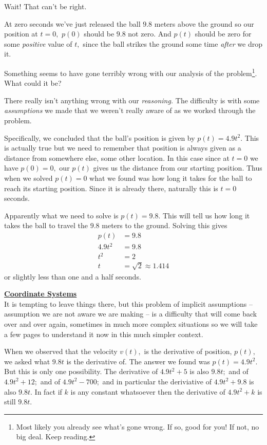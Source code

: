 {\sc Wait!} That can't be right.

At zero seconds we've just released the ball $9.8$ meters above the
ground so our position at $t=0,$ $p(0)$ should be $9.8$ not zero. And
$p(t)$ should be zero for some \emph{positive} value of $t,$  since
the ball strikes the ground some time \emph{after} we drop it.

Something seems to have gone terribly wrong with our analysis of the
problem\footnote{Most likely you already see what's gone wrong. If so,
good for you! If not, no big deal. Keep reading.}. What could it be?

There really isn't anything wrong with our \emph{reasoning.} The
difficulty is with some \emph{assumptions} we made that we weren't
really aware of as we worked through the problem.

Specifically, we concluded that the ball's position is given by
$p(t)=4.9t^2.$ This is actually true but we need to remember that
position is always given as a distance from somewhere else, some other
location. In this case since at $t=0$ we have $p(0)=0,$ our $p(t)$
gives us the distance from our starting position. Thus when we solved
$p(t)=0$ what we found was how long it takes for the ball to reach its
starting position. Since it is already there, naturally this is $t=0$
seconds.

Apparently what we need to solve is $p(t)=9.8.$ This will tell us how
long it takes the ball to travel the $9.8$ meters to the
ground. Solving this gives
\begin{align*}
  p(t) &= 9.8\\
  4.9t^2&=9.8\\
  t^2&=2\\
  t&=\sqrt{2}\approx 1.414
\end{align*}
or slightly less than one and a half seconds.

\noindent\underline{\bf Coordinate Systems}\\
It is tempting to leave things there, but this problem of implicit
assumptions -- assumption we are not aware we are making -- is a
difficulty that will come back over and over again, sometimes in much
more complex situations so we will take a few pages to understand it
now in this much simpler context.


When we observed that the velocity $v(t),$ is the derivative of
position, $p(t),$ we asked what $9.8t$ is the derivative of. The
answer we found was $p(t) =4.9t^2.$ But this is only one
possibility. The derivative of $4.9t^2+5$ is also $9.8t;$ and of
$4.9t^2+12;$ and of $4.9t^2-700;$ and in particular the deriviative
of $4.9t^2+9.8$ is also $9.8t.$ In fact if $k$ is any constant
whatsoever then the derivative of $4.9t^2+k$ is still $9.8t.$

